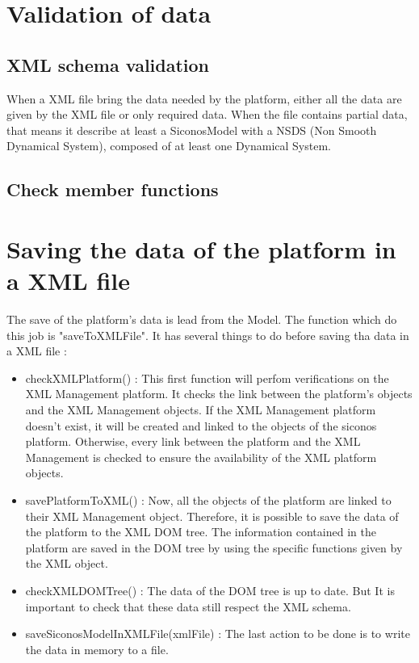 \clearpage



\label{Sec:DDD-XMLLoading}



\clearpage
 \section{Validation of data}
\subsection{XML schema validation}
When a XML file bring the data needed by the platform, either all the data are given by the XML file or only required data. When the file contains partial data, that means it describe at least a SiconosModel with a NSDS (Non Smooth Dynamical System), composed of at least one Dynamical System.

\subsection{Check member functions}



\clearpage
\section{Saving the data of the platform in a XML file}



The save of the platform's data is lead from the Model. The function which do this job is
"saveToXMLFile". It has several things to do before saving tha data in a XML file :
\begin{itemize}
        \item checkXMLPlatform() : This first function will perfom verifications on the XML Management platform. It checks the
        link between the platform's objects and the XML Management objects. If the XML Management
        platform doesn't exist, it will be created and linked to the objects of the \ac{siconos}
        platform. Otherwise, every link between the platform and the XML Management is checked to ensure
        the availability of the XML platform objects.
        \item savePlatformToXML() : Now, all the objects of the platform are linked to their XML Management object. Therefore,
        it is possible to save the data of the platform to the XML DOM tree. The information
        contained in the platform are saved in the DOM tree by using the specific functions given
        by the XML object.
        \item checkXMLDOMTree() : The data of the DOM tree is up to date. But It is important to check that these data still
        respect the XML schema. 
        \item saveSiconosModelInXMLFile(xmlFile) : The last action to be done is to write the data in memory to a file.
\end{itemize}
